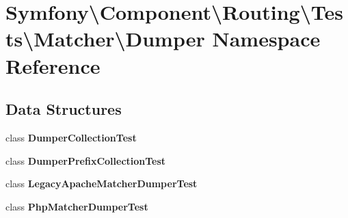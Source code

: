\section{Symfony\textbackslash{}Component\textbackslash{}Routing\textbackslash{}Tests\textbackslash{}Matcher\textbackslash{}Dumper Namespace Reference}
\label{namespace_symfony_1_1_component_1_1_routing_1_1_tests_1_1_matcher_1_1_dumper}
\subsection*{Data Structures}
\begin{DoxyCompactItemize}
\item 
class {\bf Dumper\+Collection\+Test}
\item 
class {\bf Dumper\+Prefix\+Collection\+Test}
\item 
class {\bf Legacy\+Apache\+Matcher\+Dumper\+Test}
\item 
class {\bf Php\+Matcher\+Dumper\+Test}
\end{DoxyCompactItemize}
